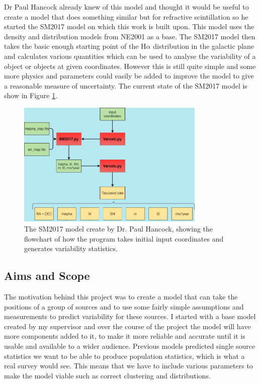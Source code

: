\documentclass[a4paper, 10pt]{article}
\begin{document}
Dr Paul Hancock already knew of this model and thought it would be useful to create a model that does something similar but for refractive scintillation so he started the SM2017 model on which this work is built upon. This model uses the density and distribution models from NE2001 as a base. The SM2017 model then takes the basic enough starting point of the H$\alpha$ distribution in the galactic plane and calculates various quantities which can be used to analyse the variability of a object or objects at given coordinates. However this is still quite simple and some more physics and parameters could easily be added to improve the model to give a reasonable measure of uncertainty. The current state of the SM2017 model is show in Figure \ref{SM2017}.
\begin{figure}[H]
\begin{center}
	\includegraphics[width=0.8\textwidth]{SM2017_old}
	\caption{The SM2017 model create by Dr. Paul Hancock, showing the flowchart of how the program takes initial input coordinates and generates variability statistics.}
	\label{SM2017}
\end{center}
\end{figure}
\subsection{Aims and Scope}
The motivation behind this project was to create a model that can take the positions of a group of sources and to use some fairly simple assumptions and measurements to predict variability for these sources. I started with a base model created by my supervisor and over the course of the project the model will have more components added to it, to make it more reliable and accurate until it is usable and available to a wider audience. Previous models predicted single source statistics we want to be able to produce population statistics, which is what a real survey would see. This means that we have to include various parameters to make the model viable such as correct clustering and distributions.\\
\end{document}
